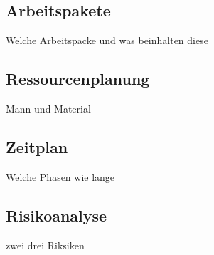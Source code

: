 \subsection{Arbeitspakete}
Welche Arbeitspacke und was beinhalten diese
\subsection{Ressourcenplanung}
Mann und Material 
\subsection{Zeitplan}
Welche Phasen wie lange
\subsection{Risikoanalyse}
zwei drei Riksiken

